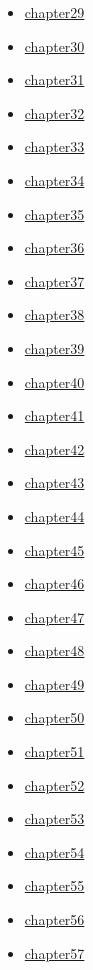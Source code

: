 \documentclass[
]{article}
\begin{document}
\begin{itemize}
\begin{itemize}
  \item
    \href{benjamin13.2-2-64.md}{chapter29}
  \item
    \href{benjamin13.2-2-67.md}{chapter30}
  \item
    \href{benjamin13.2-2-68.md}{chapter31}
  \item
    \href{benjamin13.2-2-69.md}{chapter32}
  \item
    \href{benjamin13.2-2-71.md}{chapter33}
  \item
    \href{benjamin13.2-2-72.md}{chapter34}
  \item
    \href{benjamin13.2-2-73.md}{chapter35}
  \item
    \href{benjamin13.2-2-74.md}{chapter36}
  \item
    \href{benjamin13.2-2-75.md}{chapter37}
  \item
    \href{benjamin13.2-2-77.md}{chapter38}
  \item
    \href{benjamin13.2-2-78.md}{chapter39}
  \item
    \href{benjamin13.2-2-79.md}{chapter40}
  \item
    \href{benjamin13.2-2-80.md}{chapter41}
  \item
    \href{benjamin13.2-2-81.md}{chapter42}
  \item
    \href{benjamin13.2-2-83.md}{chapter43}
  \item
    \href{benjamin13.2-2-85.md}{chapter44}
  \item
    \href{benjamin13.2-2-86.md}{chapter45}
  \item
    \href{benjamin13.2-2-89.md}{chapter46}
  \item
    \href{benjamin13.2-2-90.md}{chapter47}
  \item
    \href{benjamin13.2-2-91.md}{chapter48}
  \item
    \href{benjamin13.2-2-92.md}{chapter49}
  \item
    \href{benjamin13.2-2-93.md}{chapter50}
  \item
    \href{benjamin13.2-2-94.md}{chapter51}
  \item
    \href{benjamin13.2-2-95.md}{chapter52}
  \item
    \href{benjamin13.2-2-96.md}{chapter53}
  \item
    \href{benjamin13.2-2-101.md}{chapter54}
  \item
    \href{benjamin13.2-2-104.md}{chapter55}
  \item
    \href{benjamin13.2-2-106.md}{chapter56}
  \item
    \href{benjamin13.2-2-108.md}{chapter57}

\end{itemize}
\end{itemize}
\end{document}
